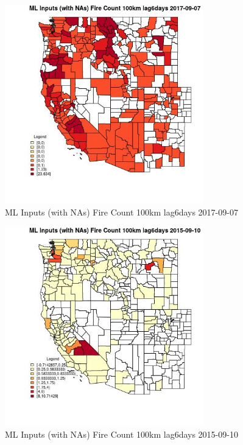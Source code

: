 \begin{figure} 
\centering  
\includegraphics[width=0.77\textwidth]{Code_Outputs/Report_ML_input_PM25_Step4_part_e_de_duplicated_aves_compiled_2019-05-21wNAs_CountyFire_Count_100km_lag6daysMean2017-09-07.jpg} 
\caption{\label{fig:Report_ML_input_PM25_Step4_part_e_de_duplicated_aves_compiled_2019-05-21wNAsCountyFire_Count_100km_lag6daysMean2017-09-07}ML Inputs (with NAs) Fire Count 100km lag6days 2017-09-07} 
\end{figure} 
 

\begin{figure} 
\centering  
\includegraphics[width=0.77\textwidth]{Code_Outputs/Report_ML_input_PM25_Step4_part_e_de_duplicated_aves_compiled_2019-05-21wNAs_CountyFire_Count_100km_lag6daysMean2015-09-10.jpg} 
\caption{\label{fig:Report_ML_input_PM25_Step4_part_e_de_duplicated_aves_compiled_2019-05-21wNAsCountyFire_Count_100km_lag6daysMean2015-09-10}ML Inputs (with NAs) Fire Count 100km lag6days 2015-09-10} 
\end{figure} 
 

